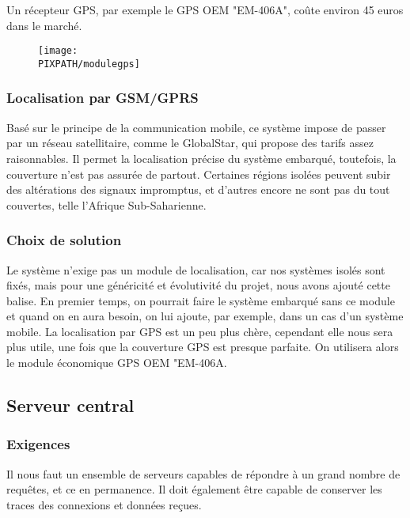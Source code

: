 Un récepteur GPS, par exemple le GPS OEM "EM-406A", coûte environ 45 euros dans le marché. 

    \begin{figure}[!h]
    \begin{center}
    \texttt{[image: \\PIXPATH/modulegps]}
    \caption{}
    \end{center}
    \end{figure}
	
\subsubsection{Localisation par GSM/GPRS}

Basé sur le principe de la communication mobile, ce système impose de passer par un réseau satellitaire, comme le GlobalStar, qui propose des tarifs assez raisonnables. Il permet la localisation précise du système embarqué, toutefois, la couverture n’est pas assurée de partout. Certaines régions isolées peuvent subir des altérations des signaux impromptus, et d’autres encore ne sont pas du tout couvertes, telle l’Afrique Sub-Saharienne.

\subsubsection{Choix de solution}
Le système n’exige pas un module de localisation, car nos systèmes isolés sont fixés, mais pour une généricité et évolutivité du projet, nous avons ajouté cette balise. 
En premier temps, on pourrait faire le système embarqué sans ce module et quand on en aura besoin, on lui ajoute, par exemple, dans un cas d’un système mobile. 
La localisation par GPS est un peu plus chère, cependant elle nous sera plus utile, une fois que la couverture GPS est presque parfaite. On utilisera alors le module économique GPS OEM "EM-406A.
	
	
\subsection{Serveur central}

    \subsubsection{Exigences}
    Il nous faut un ensemble de serveurs capables de répondre à un grand
    nombre de requêtes, et ce en permanence. Il doit également être capable
    de conserver les traces des connexions et données reçues.


